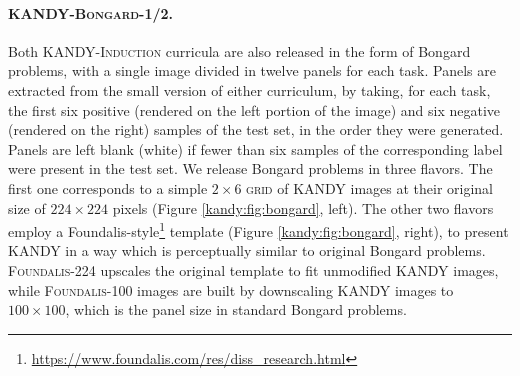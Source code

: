 %

\paragraph{\textsc{KANDY-Bongard-1/2}.} Both \textsc{KANDY-Induction} curricula are also released in the form of Bongard problems, with a single image divided in twelve panels for each task. Panels are extracted from the small version of either curriculum, by taking, for each task, the first six positive (rendered on the left portion of the image) and six negative (rendered on the right) samples of the test set, in the order they were generated. Panels are left blank (white) if fewer than six samples of the corresponding label were present in the test set.
We release Bongard problems in three flavors. The first one corresponds to a simple $2\times6$ \textsc{grid} of \textsc{KANDY} images at their original size of  $224 \times 224$ pixels (Figure \ref{kandy:fig:bongard}, left). The other two flavors employ a Foundalis-style\footnote{\url{https://www.foundalis.com/res/diss_research.html}} template (Figure \ref{kandy:fig:bongard}, right), to present \textsc{KANDY} in a way which is perceptually similar to original Bongard problems. \textsc{Foundalis-224} upscales the original template to fit unmodified KANDY images, while \textsc{Foundalis-100} images  are built by downscaling KANDY images to $100\times 100$, which is the panel size in standard Bongard problems.

